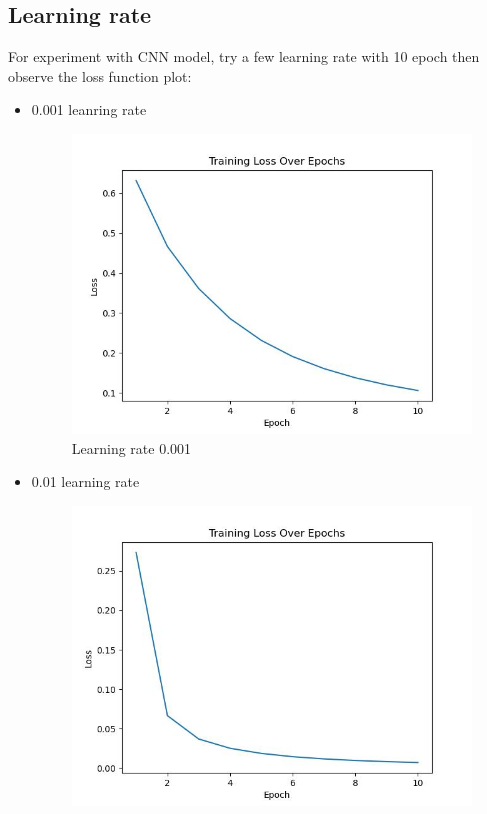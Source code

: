 \documentclass[journal]{IEEEtran} %
\begin{document}
\subsection{Learning rate}
For experiment with CNN model, try a few learning rate with 10 epoch then observe the loss function plot:
\begin{itemize}
    \item 0.001 leanring rate 
    \begin{figure}[h!]
        \centering
        \includegraphics[width=1\linewidth]{learningRate1.png}
        \caption{Learning rate 0.001}
    \end{figure}
    \item 0.01 learning rate
    \begin{figure}[h!]
        \centering
        \includegraphics[width=1\linewidth]{learningRate2.png}

\end{figure}
\end{itemize}
\end{document}
